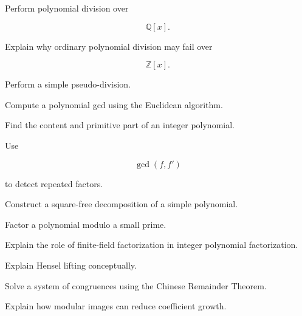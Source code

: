 \begin{exercise}[2]
Perform polynomial division over

\[
\mathbb{Q}[x].
\]
\end{exercise}

\begin{exercise}[3]
Explain why ordinary polynomial division may fail over

\[
\mathbb{Z}[x].
\]
\end{exercise}

\begin{exercise}[3]
Perform a simple pseudo-division.
\end{exercise}

\begin{exercise}[2]
Compute a polynomial gcd using the Euclidean algorithm.
\end{exercise}

\begin{exercise}[3]
Find the content and primitive part of an integer polynomial.
\end{exercise}

\begin{exercise}[3]
Use

\[
\gcd(f,f')
\]

to detect repeated factors.
\end{exercise}

\begin{exercise}[3]
Construct a square-free decomposition of a simple polynomial.
\end{exercise}

\begin{exercise}[3]
Factor a polynomial modulo a small prime.
\end{exercise}

\begin{exercise}[3]
Explain the role of finite-field factorization in integer polynomial
factorization.
\end{exercise}

\begin{exercise}[3]
Explain Hensel lifting conceptually.
\end{exercise}

\begin{exercise}[2]
Solve a system of congruences using the Chinese Remainder Theorem.
\end{exercise}

\begin{exercise}[3]
Explain how modular images can reduce coefficient growth.
\end{exercise}

